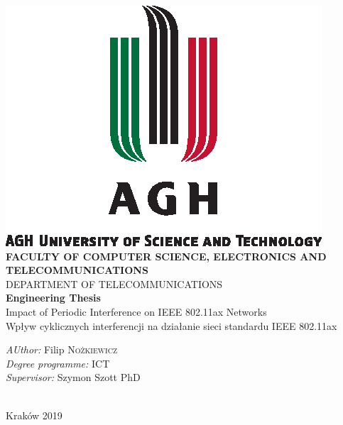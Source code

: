 \begin{titlepage}

\begin{center}

\includegraphics[scale=1.25]{agh_nzw_s_en_1w_wbr_pms}\\[0.2cm]

\textbf{\scriptsize  FACULTY OF COMPUTER SCIENCE,  ELECTRONICS AND TELECOMMUNICATIONS}\\[0.2cm]

\textsc{\scriptsize DEPARTMENT OF TELECOMMUNICATIONS}\\[1cm]

\textbf{\small Engineering Thesis}\\[1cm]

{\huge Impact of Periodic Interference on IEEE 802.11ax Networks}\\[0.5cm]
{\huge Wpływ cyklicznych interferencji na działanie sieci standardu IEEE 802.11ax}\\

\vfill

\begin{minipage}{0.8\textwidth}
\begin{flushleft}
{\large \emph{AUthor:} \hfill Filip \textsc{Nożkiewicz}}\\[0.1cm]
{\large \emph{Degree programme:} \hfill \textsc{ICT}}\\[0.1cm]
{\large \emph{Supervisor:} \hfill Szymon Szott PhD\textsc{}}
\end{flushleft}
\end{minipage}\\[2cm]

Kraków 2019

\end{center}

\end{titlepage}
